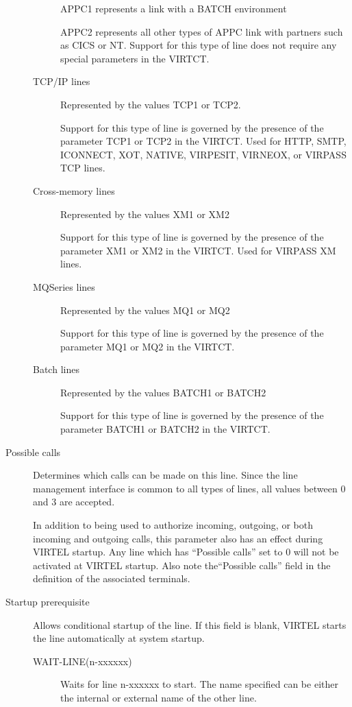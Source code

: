 \documentclass[letterpaper,10pt,english]{sphinxmanual}
\begin{document}
\begin{description}
\begin{description}
APPC1 represents a link with a BATCH environment

APPC2 represents all other types of APPC link with partners such as
CICS or NT. Support for this type of line does not require any
special parameters in the VIRTCT.

\item[{TCP/IP lines}] \leavevmode
Represented by the values TCP1 or TCP2.

Support for this type of line is governed by the presence of the
parameter TCP1 or TCP2 in the VIRTCT. Used for HTTP, SMTP, ICONNECT,
XOT, NATIVE, VIRPESIT, VIRNEOX, or VIRPASS TCP lines.

\item[{Cross-memory lines}] \leavevmode
Represented by the values XM1 or XM2

Support for this type of line is governed by the presence of the
parameter XM1 or XM2 in the VIRTCT. Used for VIRPASS XM lines.

\item[{MQSeries lines}] \leavevmode
Represented by the values MQ1 or MQ2

Support for this type of line is governed by the presence of the
parameter MQ1 or MQ2 in the VIRTCT.

\item[{Batch lines}] \leavevmode
Represented by the values BATCH1 or BATCH2

Support for this type of line is governed by the presence of the
parameter BATCH1 or BATCH2 in the VIRTCT.

\end{description}

\item[{Possible calls}] \leavevmode
Determines which calls can be made on this line. Since the line
management interface is common to all types of lines, all values
between 0 and 3 are accepted.

In addition to being used to authorize incoming, outgoing, or both
incoming and outgoing calls, this parameter also has an effect
during VIRTEL startup. Any line which has “Possible calls” set to 0
will not be activated at VIRTEL startup. Also note the“Possible
calls” field in the definition of the associated terminals.

\item[{Startup prerequisite}] \leavevmode
Allows conditional startup of the line. If this field is blank,
VIRTEL starts the line automatically at system startup.
\begin{description}
\item[{WAIT-LINE(n-xxxxxx)}] \leavevmode
Waits for line n-xxxxxx to start. The name specified can be either
the internal or external name of the other line.


\end{description}
\end{description}
\end{document}
